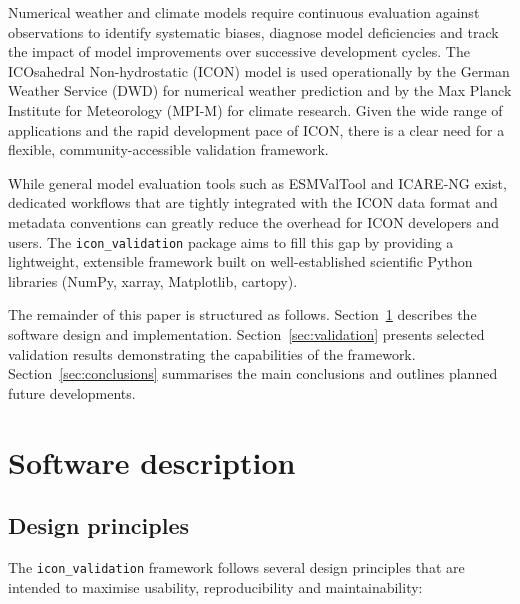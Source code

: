 \documentclass[gmd, manuscript]{copernicus}
\begin{document}
Numerical weather and climate models require continuous evaluation against
observations to identify systematic biases, diagnose model deficiencies and
track the impact of model improvements over successive development cycles.
The ICOsahedral Non-hydrostatic (ICON) model \citep{zaengl2015icon} is
used operationally by the German Weather Service (DWD) for numerical weather
prediction and by the Max Planck Institute for Meteorology (MPI-M) for
climate research.
Given the wide range of applications and the rapid development pace of ICON,
there is a clear need for a flexible, community-accessible validation
framework.

While general model evaluation tools such as ESMValTool
\citep{righi2020esmvaltool} and ICARE-NG exist, dedicated workflows that
are tightly integrated with the ICON data format and metadata conventions
can greatly reduce the overhead for ICON developers and users.
The \texttt{icon\_validation} package aims to fill this gap by providing
a lightweight, extensible framework built on well-established scientific
Python libraries (NumPy, xarray, Matplotlib, cartopy).

The remainder of this paper is structured as follows.
Section~\ref{sec:description} describes the software design and
implementation.
Section~\ref{sec:validation} presents selected validation results
demonstrating the capabilities of the framework.
Section~\ref{sec:conclusions} summarises the main conclusions and
outlines planned future developments.

\section{Software description}
\label{sec:description}

\subsection{Design principles}

The \texttt{icon\_validation} framework follows several design principles
that are intended to maximise usability, reproducibility and
maintainability:
\end{document}
